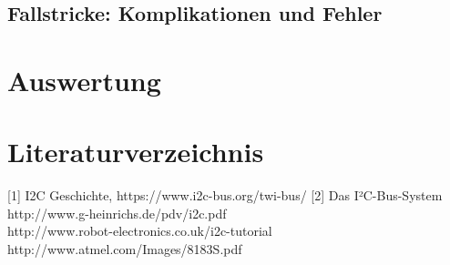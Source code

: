 \documentclass[12pt,a4paper]{report}
\begin{document}
\section{Fallstricke: Komplikationen und Fehler}


\chapter{Auswertung}

\chapter{Literaturverzeichnis}

[1] 	I2C Geschichte,  https://www.i2c-bus.org/twi-bus/
[2]	Das I²C-Bus-System\\
http://www.g-heinrichs.de/pdv/i2c.pdf\\
http://www.robot-electronics.co.uk/i2c-tutorial\\
http://www.atmel.com/Images/8183S.pdf\\
\end{document}
